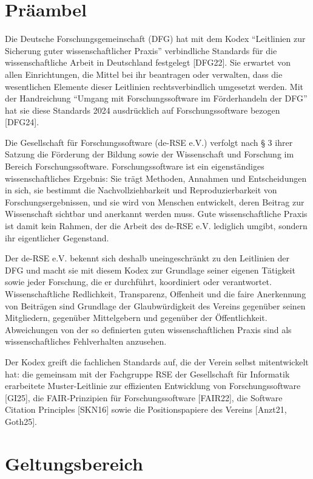 \documentclass[a4paper, fontsize=11pt]{scrartcl}
\begin{document}
\section{Präambel}

Die Deutsche Forschungsgemeinschaft (DFG) hat mit dem Kodex \enquote{Leitlinien zur Sicherung guter wissenschaftlicher Praxis} verbindliche Standards für die wissenschaftliche Arbeit in Deutschland festgelegt [DFG22]. Sie erwartet von allen Einrichtungen, die Mittel bei ihr beantragen oder verwalten, dass die wesentlichen Elemente dieser Leitlinien rechtsverbindlich umgesetzt werden. Mit der Handreichung \enquote{Umgang mit Forschungssoftware im Förderhandeln der DFG} hat sie diese Standards 2024 ausdrücklich auf Forschungssoftware bezogen [DFG24].

Die Gesellschaft für Forschungssoftware (de-RSE e.V.) verfolgt nach § 3 ihrer Satzung die Förderung der Bildung sowie der Wissenschaft und Forschung im Bereich Forschungssoftware. Forschungssoftware ist ein eigenständiges wissenschaftliches Ergebnis: Sie trägt Methoden, Annahmen und Entscheidungen in sich, sie bestimmt die Nachvollziehbarkeit und Reproduzierbarkeit von Forschungsergebnissen, und sie wird von Menschen entwickelt, deren Beitrag zur Wissenschaft sichtbar und anerkannt werden muss. Gute wissenschaftliche Praxis ist damit kein Rahmen, der die Arbeit des de-RSE e.V. lediglich umgibt, sondern ihr eigentlicher Gegenstand.

Der de-RSE e.V. bekennt sich deshalb uneingeschränkt zu den Leitlinien der DFG und macht sie mit diesem Kodex zur Grundlage seiner eigenen Tätigkeit sowie jeder Forschung, die er durchführt, koordiniert oder verantwortet. Wissenschaftliche Redlichkeit, Transparenz, Offenheit und die faire Anerkennung von Beiträgen sind Grundlage der Glaubwürdigkeit des Vereins gegenüber seinen Mitgliedern, gegenüber Mittelgebern und gegenüber der Öffentlichkeit. Abweichungen von der so definierten guten wissenschaftlichen Praxis sind als wissenschaftliches Fehlverhalten anzusehen.

Der Kodex greift die fachlichen Standards auf, die der Verein selbst mitentwickelt hat: die gemeinsam mit der Fachgruppe RSE der Gesellschaft für Informatik erarbeitete Muster-Leitlinie zur effizienten Entwicklung von Forschungssoftware [GI25], die FAIR-Prinzipien für Forschungssoftware [FAIR22], die Software Citation Principles [SKN16] sowie die Positionspapiere des Vereins [Anzt21, Goth25].

\section{Geltungsbereich}
\end{document}
